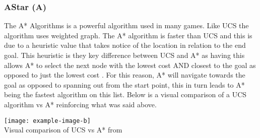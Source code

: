\subsubsection{AStar (A\*)}
The A* Algorithms is a powerful algorithm used in many games. Like UCS the algorithm uses weighted graph. The A* algorithm is faster than UCS and this is due to a heuristic value that takes notice of the location in relation to the end goal. This heuristic is they key difference between UCS and A* as having this allows A* to select the next node with the lowest cost AND closest to the goal as opposed to just the lowest cost \citetemp. For this reason, A* will navigate towards the goal as opposed to spanning out from the start point, this in turn leads to A* being the fastest algorithm on this list. 
Below is a visual comparison of a UCS algorithm vs A* reinforcing what was said above.
\begin{center}
	\texttt{[image: example-image-b]}\\
	Visual comparison of UCS vs A* from \citetemp
\end{center}

